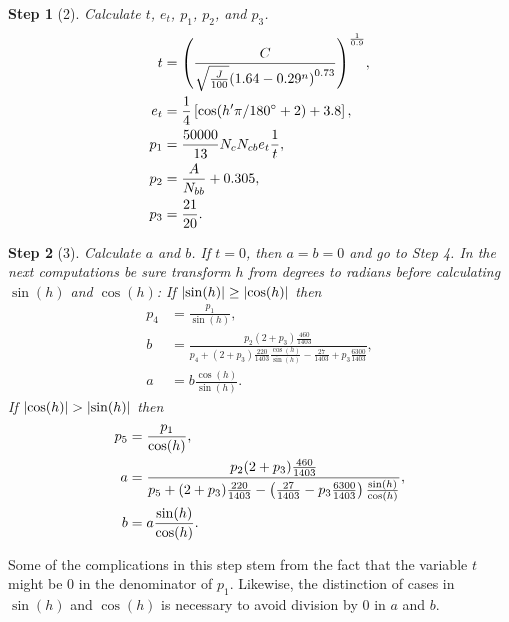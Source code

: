 \documentclass[twocolumn]{scrartcl}
\theoremstyle{named}
\newtheorem*{step}{Step}
\DeclarePairedDelimiter\abs{\lvert}{\rvert}%
\begin{document}
\begin{step}[2]
Calculate $t$, $e_t$, $p_1$, $p_2$, and $p_3$.
\begin{align*}
  t &= {\left(\frac{C}{\sqrt{\frac{J}{100}} {(1.64 - 0.29^n)}^{0.73}}\right)}^\frac{1}{0.9},\\
  e_t &= \frac{1}{4} \left[\cos(h'\pi/180\degree + 2) + 3.8\right],\\
  p_1 &= \frac{50000}{13} N_c N_{cb} e_t \frac{1}{t},\\
  p_2 &= \frac{A}{N_{bb}} + 0.305,\\
  p_3 &= \frac{21}{20}.
\end{align*}
\end{step}

\begin{step}[3]
Calculate $a$ and $b$.
If $t=0$, then $a=b=0$ and go to Step 4.
In the next computations be sure transform $h$ from degrees to radians before
calculating $\sin(h)$ and $\cos(h)$: If $\abs{\sin(h)} \ge \abs{\cos(h)}$
then
\begin{align*}
  p_4 &= \frac{p_1}{\sin(h)},\\
  b &= \frac{p_2 (2+p_3) \frac{460}{1403}}{p_4 + (2+p_3) \frac{220}{1403} \frac{\cos(h)}{\sin(h)} - \frac{27}{1403} + p_3 \frac{6300}{1403}},\\
  a &= b \frac{\cos(h)}{\sin(h)}.
\end{align*}
If $\abs{\cos(h)} > \abs{\sin(h)}$ then
\begin{align*}
  p_5 &= \frac{p_1}{\cos(h)},\\
  a &= \frac{p_2 (2+p_3) \frac{460}{1403}}{%
    p_5
    + (2+p_3) \frac{220}{1403} -
    \left(\frac{27}{1403}  - p_3 \frac{6300}{1403}\right) \frac{\sin(h)}{\cos(h)}
  },\\
  b &= a \frac{\sin(h)}{\cos(h)}.
\end{align*}
\end{step}

Some of the complications in this step stem from the fact that the variable $t$
might be $0$ in the denominator of $p_1$. Likewise, the distinction of cases in $\sin(h)$ and $\cos(h)$ is necessary
to avoid division by $0$ in $a$ and $b$.
\end{document}
